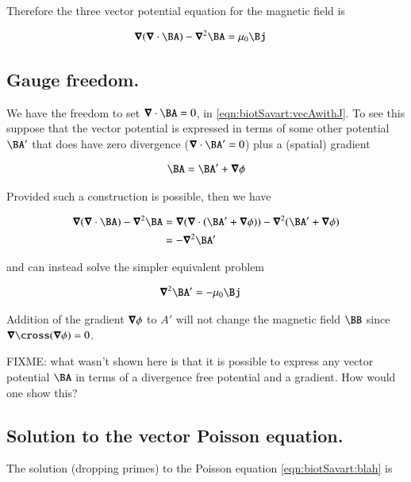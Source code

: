 Therefore the three vector potential equation for the magnetic field is

\begin{align}\label{eqn:biotSavart:vecAwithJ}
\spacegrad (\spacegrad \cdot \BA) - \spacegrad^2 \BA &= \mu_0 \Bj
\end{align}

\subsection{Gauge freedom. }

We have the freedom to set $\spacegrad \cdot \BA = 0$, in \ref{eqn:biotSavart:vecAwithJ}.  To see this suppose that the vector potential is
expressed in terms of some other potential $\BA'$ that does have zero divergence ($\spacegrad \cdot \BA' = 0$) plus a (spatial) gradient

\begin{align*}
\BA = \BA' + \spacegrad \phi
\end{align*}

Provided such a construction is possible, then we have

\begin{align*}
\spacegrad (\spacegrad \cdot \BA) - \spacegrad^2 \BA
&=
\spacegrad (\spacegrad \cdot (\BA' + \spacegrad \phi)) - \spacegrad^2 (\BA' + \spacegrad \phi) \\
&=
- \spacegrad^2 \BA'
\end{align*}

and can instead solve the simpler equivalent problem

\begin{align}\label{eqn:biotSavart:blah}
\spacegrad^2 \BA'  &= -\mu_0 \Bj
\end{align}

Addition of the gradient $\boldsymbol{\nabla} \phi$ to $A'$ will not change the magnetic field $\BB$ since $\spacegrad \cross (\spacegrad \phi) = 0$.

FIXME: what wasn't shown here is that it is possible to express any vector potential $\BA$ in terms of a divergence free potential and a
gradient.  How would one show this?

\subsection{Solution to the vector Poisson equation. }

The solution (dropping primes) to the Poisson equation \ref{eqn:biotSavart:blah} is

